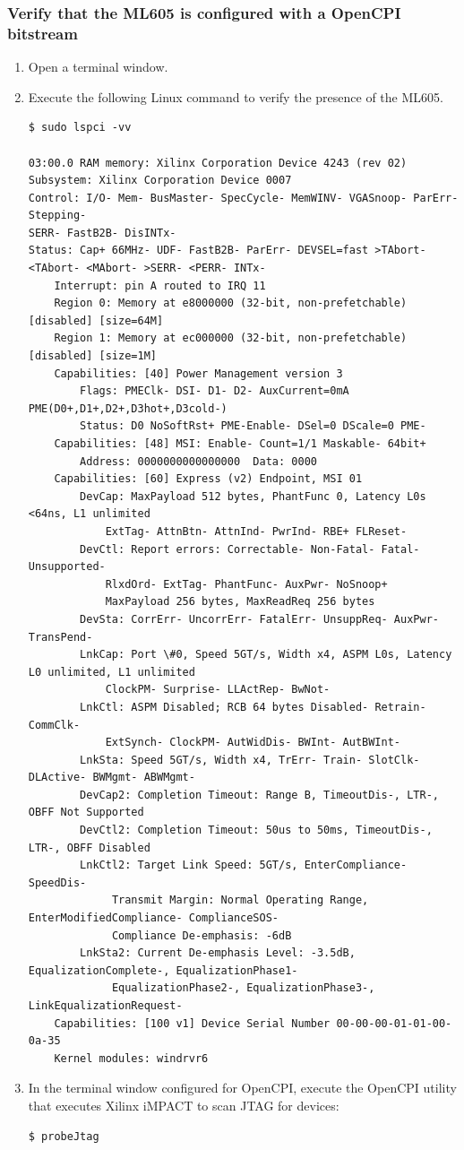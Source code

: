 \subsubsection{Verify that the ML605 is configured with a OpenCPI bitstream}
\begin{enumerate}
	\item Open a terminal window.
	\item Execute the following Linux command to verify the presence of the ML605.
	\begin{verbatim}
$ sudo lspci -vv

03:00.0 RAM memory: Xilinx Corporation Device 4243 (rev 02)
Subsystem: Xilinx Corporation Device 0007
Control: I/O- Mem- BusMaster- SpecCycle- MemWINV- VGASnoop- ParErr- Stepping-
SERR- FastB2B- DisINTx-
Status: Cap+ 66MHz- UDF- FastB2B- ParErr- DEVSEL=fast >TAbort-
<TAbort- <MAbort- >SERR- <PERR- INTx-
	Interrupt: pin A routed to IRQ 11
	Region 0: Memory at e8000000 (32-bit, non-prefetchable) [disabled] [size=64M]
	Region 1: Memory at ec000000 (32-bit, non-prefetchable) [disabled] [size=1M]
	Capabilities: [40] Power Management version 3
		Flags: PMEClk- DSI- D1- D2- AuxCurrent=0mA PME(D0+,D1+,D2+,D3hot+,D3cold-)
		Status: D0 NoSoftRst+ PME-Enable- DSel=0 DScale=0 PME-
	Capabilities: [48] MSI: Enable- Count=1/1 Maskable- 64bit+
		Address: 0000000000000000  Data: 0000
	Capabilities: [60] Express (v2) Endpoint, MSI 01
		DevCap:	MaxPayload 512 bytes, PhantFunc 0, Latency L0s <64ns, L1 unlimited
			ExtTag- AttnBtn- AttnInd- PwrInd- RBE+ FLReset-
		DevCtl:	Report errors: Correctable- Non-Fatal- Fatal- Unsupported-
			RlxdOrd- ExtTag- PhantFunc- AuxPwr- NoSnoop+
			MaxPayload 256 bytes, MaxReadReq 256 bytes
		DevSta:	CorrErr- UncorrErr- FatalErr- UnsuppReq- AuxPwr- TransPend-
		LnkCap:	Port \#0, Speed 5GT/s, Width x4, ASPM L0s, Latency L0 unlimited, L1 unlimited
			ClockPM- Surprise- LLActRep- BwNot-
		LnkCtl:	ASPM Disabled; RCB 64 bytes Disabled- Retrain- CommClk-
			ExtSynch- ClockPM- AutWidDis- BWInt- AutBWInt-
		LnkSta:	Speed 5GT/s, Width x4, TrErr- Train- SlotClk- DLActive- BWMgmt- ABWMgmt-
		DevCap2: Completion Timeout: Range B, TimeoutDis-, LTR-, OBFF Not Supported
		DevCtl2: Completion Timeout: 50us to 50ms, TimeoutDis-, LTR-, OBFF Disabled
		LnkCtl2: Target Link Speed: 5GT/s, EnterCompliance- SpeedDis-
			 Transmit Margin: Normal Operating Range, EnterModifiedCompliance- ComplianceSOS-
			 Compliance De-emphasis: -6dB
		LnkSta2: Current De-emphasis Level: -3.5dB, EqualizationComplete-, EqualizationPhase1-
			 EqualizationPhase2-, EqualizationPhase3-, LinkEqualizationRequest-
	Capabilities: [100 v1] Device Serial Number 00-00-00-01-01-00-0a-35
	Kernel modules: windrvr6
	\end{verbatim}
	\item In the terminal window configured for OpenCPI, execute the
	OpenCPI utility that executes Xilinx iMPACT to scan JTAG for
	devices:\smallskip
	\begin{verbatim}
$ probeJtag


\end{verbatim}
\end{enumerate}
